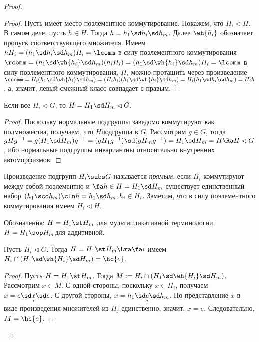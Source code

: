\documentclass[a4paper]{article}
\begin{document}
\begin{proof}
\begin{proof}
Пусть имеет место поэлементное коммутирование. Покажем, что $H_i \lhd H$. В самом деле, пусть $h \in H$.
Тогда $h=h_1\sd h_i\sd h_m$. Далее $\wh{h_i}$ обозначает пропуск соответствующего множителя. Имеем
$hH_i=(h_1\sd h_i\sd h_m) H_i = \lcomm$ в силу поэлементного коммутирования $\rcomm =(h_1\sd \wh{h_i}\sd
h_m)(h_iH_i)=(h_1\sd \wh{h_i}\sd h_m)H_i=\lcomm$ в силу поэлементного коммутирования, $H_i$ можно протащить
через произведение  $\rcomm=H_i(h_1\sd \wh{h_i}\sd h_m)= (H_ih_i)(h_1\sd \wh{h_i}\sd h_m)=H_i(h_1\sd h_i\sd
h_m)=H_ih$, а, значит, левый смежный класс совпадает с правым.
\end{proof}

\begin{imp}
Если все $H_i \lhd G$, то $H = H_1\sd H_m \lhd G$.
\end{imp}
\begin{proof}
Поскольку нормальные подгруппы заведомо коммутируют как
подмножества, получаем, что $H$\т подгруппа в $G$. Рассмотрим $g \in G$, тогда
$gHg^{-1}=g(H_1\sd H_m)g^{-1}=(gH_1g^{-1})\sd (gH_mg^{-1})=H_1\sd H_m=H
\Ra H \lhd G$, ибо нормальные подгруппы инвариантны
относительно внутренних автоморфизмов.
\end{proof}

\begin{df}
Произведение подгрупп $H_i \subs G$ называется \emph{прямым}, если $H_i$ коммутируют между собой поэлементно и
$\fa h \in H=H_1\sd H_m$ существует единственный набор $(h_1\sco h_m)\cln h=h_1\sd h_m, h_i \in H_i$.
Заметим, что в силу поэлементного коммутирования имеем $H_i \lhd H$.
\end{df}

Обозначения: $H=H_1\st H_m$ для мультипликативной терминологии, $H=H_1\sop H_m$\т для аддитивной.

\begin{theorem}
Пусть $H_i \lhd G$. Тогда $H=H_1\st H_m \Lra \fa i$ имеем $H_i \cap (H_1\sd \wh{H_i}\sd H_m) = \hc{e}$.
\end{theorem}
\begin{proof}
Пусть $H=H_1\st H_m$. Тогда $M := H_i \cap (H_1\sd \wh{H_i}\sd H_m)$.  Рассмотрим $x \in M$. С одной стороны,
поскольку $x \in H_i$, получаем $x = e\sd\underset{i}{x}\sd e$. С другой стороны, $x=h_1\sd
\underset{i}{e}\sd h_m$. Но представление $x$ в виде произведения множителей из $H_j$ единственно, значит,
$x=e$. Следовательно, $M=\hc{e}$.


\end{proof}
\end{proof}
\end{document}
